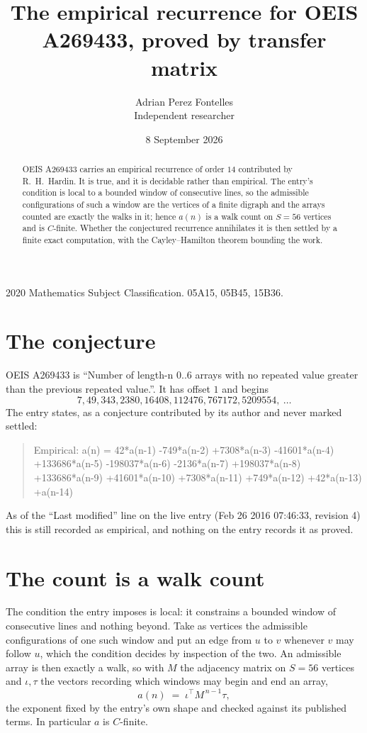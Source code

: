 \documentclass[11pt,a4paper]{article}
\title{The empirical recurrence for OEIS A269433, proved by transfer matrix}
\author{Adrian Perez Fontelles\\ \small Independent researcher}
\date{8 September 2026}
\theoremstyle{plain}
\theoremstyle{definition}
\begin{document}
\maketitle

\begin{abstract}
OEIS A269433 carries an empirical recurrence of order $14$ contributed by R.~H.~Hardin. It is
true, and it is decidable rather than empirical. The entry's condition is local to a bounded window of consecutive lines, so
the admissible configurations of such a window are the vertices of a finite digraph and the
arrays counted are exactly the walks in it; hence $a(n)$ is a walk count on $S=56$ vertices
and is $C$-finite. Whether the conjectured recurrence annihilates it is then settled by a
finite exact computation, with the Cayley--Hamilton theorem bounding the work.
\end{abstract}

\noindent\small 2020 Mathematics Subject Classification. 05A15, 05B45, 15B36.\normalsize

\section{The conjecture}

OEIS A269433 is ``Number of length-n 0..6 arrays with no repeated value greater than the previous repeated value.''. It has offset $1$ and begins
\[
7, 49, 343, 2380, 16408, 112476, 767172, 5209554,\ \dots
\]
The entry states, as a conjecture contributed by its author and never marked settled:
\begin{quote}
Empirical: a(n) = 42*a(n-1) -749*a(n-2) +7308*a(n-3) -41601*a(n-4) +133686*a(n-5) -198037*a(n-6) -2136*a(n-7) +198037*a(n-8) +133686*a(n-9) +41601*a(n-10) +7308*a(n-11) +749*a(n-12) +42*a(n-13) +a(n-14)
\end{quote}
As of the ``Last modified'' line on the live entry (Feb 26 2016 07:46:33, revision 4) this is still
recorded as empirical, and nothing on the entry records it as proved.

\section{The count is a walk count}

The condition the entry imposes is local: it constrains a bounded window of consecutive lines and nothing beyond. Take as
vertices the admissible configurations of one such window and put an edge from $u$ to $v$
whenever $v$ may follow $u$, which the condition decides by inspection of the two. An
admissible array is then exactly a walk, so with $M$ the adjacency matrix on $S=56$ vertices
and $\iota,\tau$ the vectors recording which windows may begin and end an array,
\[
a(n)\;=\;\iota^{\!\top}M^{\,n-1}\tau ,
\]
the exponent fixed by the entry's own shape and checked against its published terms. In
particular $a$ is $C$-finite.
\end{document}

